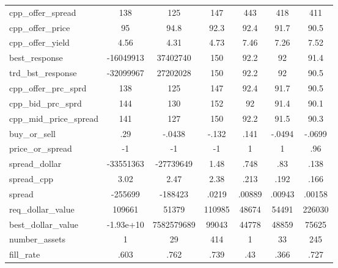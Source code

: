 \begin{tabular}{l*{6}{c}}
cpp\_offer\_spread              &          138&          125&          147&          443&          418&          411\\
cpp\_offer\_price               &           95&         94.8&         92.3&         92.4&         91.7&         90.5\\
cpp\_offer\_yield               &         4.56&         4.31&         4.73&         7.46&         7.26&         7.52\\
best\_response                 &    -16049913&     37402740&          150&         92.2&           92&         91.4\\
trd\_bst\_response              &    -32099967&     27202028&          150&         92.2&           92&         90.5\\
cpp\_offer\_prc\_sprd            &          138&          125&          147&         92.4&         91.7&         90.5\\
cpp\_bid\_prc\_sprd              &          144&          130&          152&           92&         91.4&         90.1\\
cpp\_mid\_price\_spread          &          141&          127&          150&         92.2&         91.5&         90.3\\
buy\_or\_sell                   &          .29&       -.0438&        -.132&         .141&       -.0494&       -.0699\\
price\_or\_spread               &           -1&           -1&           -1&            1&            1&          .96\\
spread\_dollar                 &    -33551363&    -27739649&         1.48&         .748&          .83&         .138\\
spread\_cpp                    &         3.02&         2.47&         2.38&         .213&         .192&         .166\\
spread                        &      -255699&      -188423&        .0219&       .00889&       .00943&       .00158\\
req\_dollar\_value              &       109661&        51379&       110985&        48674&        54491&       226030\\
best\_dollar\_value             &    -1.93e+10&   7582579689&        99043&        44778&        48859&        75625\\
number\_assets                 &            1&           29&          414&            1&           33&          245\\
fill\_rate                     &         .603&         .762&         .739&          .43&         .366&         .727\\

\end{tabular}

